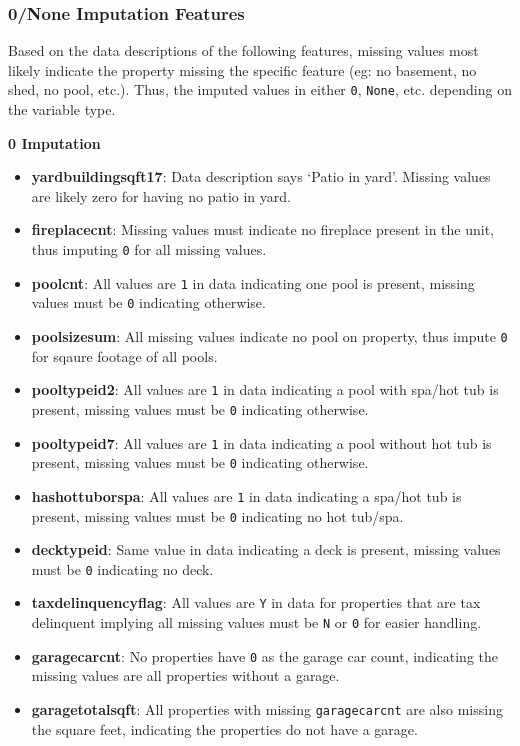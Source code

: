 \documentclass[11pt]{article}
\providecommand{\tightlist}{%
      \setlength{\itemsep}{0pt}\setlength{\parskip}{0pt}}
\begin{document}
\hypertarget{none-imputation-features}{%
\subsubsection{0/None Imputation
Features}\label{none-imputation-features}}

Based on the data descriptions of the following features, missing values
most likely indicate the property missing the specific feature (eg: no
basement, no shed, no pool, etc.). Thus, the imputed values in either
\texttt{0}, \texttt{None}, etc. depending on the variable type.

\textbf{0 Imputation}

\begin{itemize}
\tightlist
\item
  \textbf{yardbuildingsqft17}: Data description says `Patio in yard'.
  Missing values are likely zero for having no patio in yard.
\item
  \textbf{fireplacecnt}: Missing values must indicate no fireplace
  present in the unit, thus imputing \texttt{0} for all missing values.
\item
  \textbf{poolcnt}: All values are \texttt{1} in data indicating one
  pool is present, missing values must be \texttt{0} indicating
  otherwise.
\item
  \textbf{poolsizesum}: All missing values indicate no pool on property,
  thus impute \texttt{0} for sqaure footage of all pools.
\item
  \textbf{pooltypeid2}: All values are \texttt{1} in data indicating a
  pool with spa/hot tub is present, missing values must be \texttt{0}
  indicating otherwise.
\item
  \textbf{pooltypeid7}: All values are \texttt{1} in data indicating a
  pool without hot tub is present, missing values must be \texttt{0}
  indicating otherwise.
\item
  \textbf{hashottuborspa}: All values are \texttt{1} in data indicating
  a spa/hot tub is present, missing values must be \texttt{0} indicating
  no hot tub/spa.
\item
  \textbf{decktypeid}: Same value in data indicating a deck is present,
  missing values must be \texttt{0} indicating no deck.
\item
  \textbf{taxdelinquencyflag}: All values are \texttt{Y} in data for
  properties that are tax delinquent implying all missing values must be
  \texttt{N} or \texttt{0} for easier handling.
\item
  \textbf{garagecarcnt}: No properties have \texttt{0} as the garage car
  count, indicating the missing values are all properties without a
  garage.
\item
  \textbf{garagetotalsqft}: All properties with missing
  \texttt{garagecarcnt} are also missing the square feet, indicating the
  properties do not have a garage.
\end{itemize}
\end{document}
